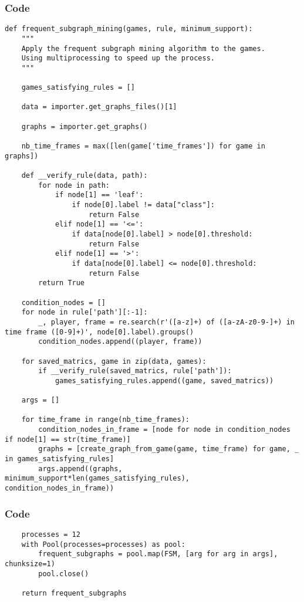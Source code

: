 \documentclass{beamer}
\begin{document}
\begin{frame}[fragile]
    \frametitle{Code}
    \fontsize{3pt}{5pt}\selectfont
    \begin{verbatim}
def frequent_subgraph_mining(games, rule, minimum_support):
    """
    Apply the frequent subgraph mining algorithm to the games.
    Using multiprocessing to speed up the process.
    """
    
    games_satisfying_rules = []
    
    data = importer.get_graphs_files()[1]
    
    graphs = importer.get_graphs()

    nb_time_frames = max([len(game['time_frames']) for game in graphs])

    def __verify_rule(data, path):
        for node in path:
            if node[1] == 'leaf':
                if node[0].label != data["class"]:
                    return False
            elif node[1] == '<=':
                if data[node[0].label] > node[0].threshold:
                    return False
            elif node[1] == '>':
                if data[node[0].label] <= node[0].threshold:
                    return False
        return True
    
    condition_nodes = []
    for node in rule['path'][:-1]:
        _, player, frame = re.search(r'([a-z]+) of ([a-zA-z0-9-]+) in time frame ([0-9]+)', node[0].label).groups()
        condition_nodes.append((player, frame))

    for saved_matrics, game in zip(data, games):
        if __verify_rule(saved_matrics, rule['path']):
            games_satisfying_rules.append((game, saved_matrics))

    args = []
    
    for time_frame in range(nb_time_frames):
        condition_nodes_in_frame = [node for node in condition_nodes if node[1] == str(time_frame)]
        graphs = [create_graph_from_game(game, time_frame) for game, _ in games_satisfying_rules]
        args.append((graphs, minimum_support*len(games_satisfying_rules), condition_nodes_in_frame))
    \end{verbatim}
\end{frame}

\begin{frame}[t, fragile]
    \frametitle{Code}
    \fontsize{3pt}{5pt}\selectfont
    \begin{verbatim}
    processes = 12
    with Pool(processes=processes) as pool:
        frequent_subgraphs = pool.map(FSM, [arg for arg in args], chunksize=1)
        pool.close()
    
    return frequent_subgraphs
    \end{verbatim}
\end{frame}
\end{document}
